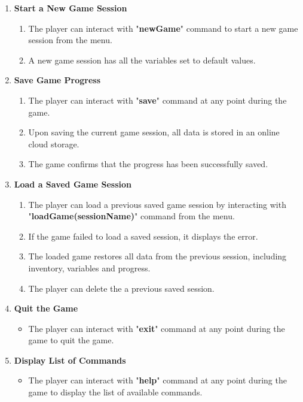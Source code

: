 \documentclass{article}
\begin{document}
    \begin{enumerate}
        \item \textbf{Start a New Game Session}
\begin{enumerate}
    \item The player can interact with "\textbf{newGame}" command to start a new game session from the menu.
    \item A new game session has all the variables set to default values.
\end{enumerate}

    \item \textbf{Save Game Progress}
\begin{enumerate}
    \item The player can interact with "\textbf{save}" command at any point during the game.
    \item Upon saving the current game session, all data is stored in an online cloud storage.
    \item The game confirms that the progress has been successfully saved.
\end{enumerate}

    \item \textbf{Load a Saved Game Session}
\begin{enumerate}
    \item The player can load a previous saved game session by interacting with "\textbf{loadGame(sessionName)}" command from the menu.
    \item If the game failed to load a saved session, it displays the error.
    \item The loaded game restores all data from the previous session, including inventory, variables and progress.
    \item The player can delete the a previous saved session.
\end{enumerate}

    \item \textbf{Quit the Game}
\begin{itemize}
    \item The player can interact with "\textbf{exit}" command at any point during the game to quit the game. 
    
\end{itemize}

    \item \textbf{Display List of Commands}
\begin{itemize}
    \item The player can interact with "\textbf{help}" command at any point during the game to display the list of available commands.
\end{itemize}


\end{enumerate}
\end{document}
